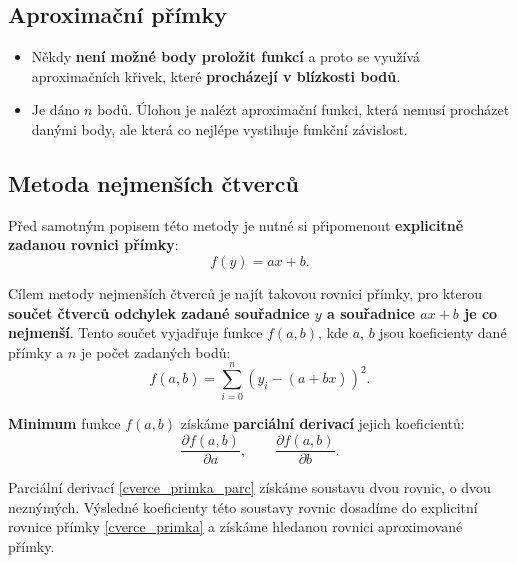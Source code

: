 \subsection{Aproximační přímky}
\begin{itemize}
    \item Někdy \textbf{není možné body proložit funkcí} a proto se využívá aproximačních křivek, které \textbf{procházejí v blízkosti bodů}.
    \item Je dáno $n$ bodů. Úlohou je nalézt aproximační funkci, která nemusí procházet danými body, ale která co nejlépe vystihuje funkční závislost.
\end{itemize}

\subsection{Metoda nejmenších čtverců}
Před samotným popisem této metody je nutné si připomenout \textbf{explicitně zadanou rovnici přímky}:
\begin{equation}\label{cverce_primka}
    f(y) = ax + b.
\end{equation}

Cílem metody nejmenších čtverců je najít takovou rovnici přímky, pro kterou \textbf{součet čtverců odchylek zadané souřadnice $y$ a souřadnice $ax + b$ je co nejmenší}. Tento součet vyjadřuje funkce $f(a,b)$, kde $a$, $b$ jsou koeficienty dané přímky a $n$ je počet zadaných bodů:
\begin{equation}\label{ctverce_suma}
    f(a,b) = \sum_{i=0}^{n}(y_i - (a + bx))^2.
\end{equation}

\textbf{Minimum} funkce $f(a,b)$ získáme \textbf{parciální derivací} jejich koeficientů:
\begin{equation}\label{cverce_primka_parc}
    \dfrac{\partial f(a,b)}{\partial a}, \quad \quad \dfrac{\partial f(a,b)}{\partial b}.
\end{equation}

Parciální derivací \eqref{cverce_primka_parc} získáme soustavu dvou rovnic, o dvou neznýmých. Výsledné koeficienty této soustavy rovnic dosadíme do explicitní rovnice přímky \eqref{cverce_primka} a získáme hledanou rovnici aproximované přímky.

